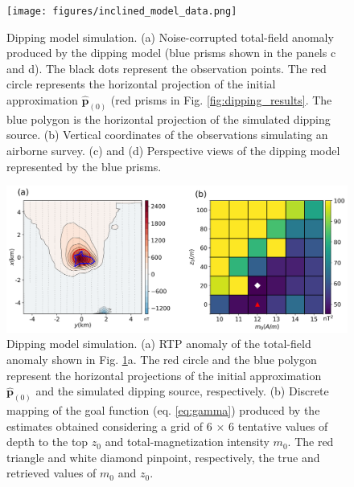
\begin{figure}
    \centering
    \texttt{[image: figures/inclined\_model\_data.png]}
    \caption{Dipping model simulation. (a) Noise-corrupted total-field anomaly produced by the dipping model (blue prisms shown in the panels c and d). The black dots represent the observation points. The red circle represents the horizontal projection 
   	of the initial approximation $\hat{\mathbf{p}}_{(0)}$ 
   	(red prisms in Fig. \ref{fig:dipping_results}. The blue polygon is the horizontal projection of the simulated dipping source.
   	(b) Vertical coordinates of the observations simulating an airborne survey. (c) and (d) Perspective views of the dipping model represented by the blue prisms.
}
    \label{fig:dipping_model}
\end{figure}

\begin{figure}
    \centering
    \includegraphics[width=\linewidth]{figures/inclined_rtp.png}
    \caption{Dipping model simulation. (a) RTP anomaly of the total-field anomaly shown in 
	Fig. \ref{fig:dipping_model}a. 
	The red circle and the blue polygon represent the horizontal projections of the 	   initial approximation $\hat{\mathbf{p}}_{(0)}$ and  the simulated dipping source, respectively.
	(b) Discrete mapping of the goal function (eq. \ref{eq:gamma}) produced by the estimates   	       obtained considering a grid of 6 $\times$ 6 tentative values of 
	   depth to the top $z_0$ and total-magnetization intensity $m_0$. 
	   The red triangle  and white diamond pinpoint, respectively, the true and retrieved 	   
	   values of $m_0$  and $z_0$.     
}
    \label{fig:dipping_rtp}
\end{figure}


